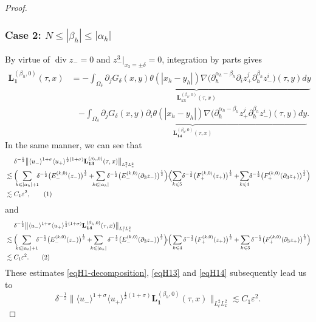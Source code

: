 \documentclass[10pt,reqno]{amsart}
\numberwithin{equation}{section}
\begin{document}
\begin{proof}
	\subsubsection*{\bf Case 2: $N\leqslant|\beta_h|\leqslant |\alpha_h|$}
	By virtue of $\operatorname{div}z_-=0$ and $ z^3_{-}|_{x_3=\pm\delta}=0$,  integration by parts gives
	\begin{align*}
		\mathbf{L}_{\mathbf{1}}^{(\beta_h,0)}(\tau,x)
		&=
		\underbrace{-\int_{\Omega_\delta}\partial_j G_\delta(x,y)\theta(|x_h-y_h|)\nabla\big(\partial_{h}^{\alpha_h-\beta_h}\partial_iz_+^j\partial_{h}^{\beta_h}z_-^i\big)(\tau,y)dy}_{\displaystyle \mathbf{L}_{\mathbf{13}}^{(\beta_h,0)}(\tau,x)}\\
		&\ \ \ \ \underbrace{-\int_{\Omega_\delta}\partial_j G_\delta(x,y)\partial_i\theta(|x_h-y_h|)\nabla\big(\partial_{h}^{\alpha_h-\beta_h}z_+^j\partial_{h}^{\beta_h}z_-^i\big)(\tau,y)dy}_{\displaystyle \mathbf{L}_{\mathbf{14}}^{(\beta_h,0)}(\tau,x)}.
	\end{align*}
	In the same manner, we can see that 
	\begin{align*}
		&\ \ \ \ \delta^{-\frac{1}{2}}\big\|\langle u_-\rangle^{1+\sigma}\langle u_+\rangle^{\frac{1}{2}(1+\sigma)}\mathbf{L}_{\mathbf{13}}^{(\beta_h,0)}(\tau,x)\big\|_{L^2_tL^2_x}\\
		&\lesssim \Big(\!\!\!\sum_{k\leqslant |\alpha_h|+1}\!\!\!\delta^{-\frac{1}{2}}\big(E_-^{(k,0)}(z_-)\big)^{\frac{1}{2}}+\!\!\!\sum_{k\leqslant |\alpha_h|}\!\!\!\delta^{-\frac{1}{2}}\big(E_-^{(k,0)}(\partial_3z_-)\big)^{\frac{1}{2}}\Big)\!\!
		\cdot\!\!\Big(\!\sum_{k\leqslant 5}\!\delta^{-\frac{1}{2}}\big(F_+^{(k,0)}(z_+)\big)^{\frac{1}{2}}+\!\sum_{k\leqslant 4}\!\delta^{-\frac{1}{2}}\big(F_+^{(k,0)}(\partial_3z_+)\big)^{\frac{1}{2}}\Big)\\
		&\lesssim C_1\varepsilon^2,\stepcounter{equation}\tag{\theequation}\label{eqH13}
	\end{align*}
	and
	\begin{align*}
		&\ \ \ \ 	\delta^{-\frac{1}{2}}\big\|\langle u_-\rangle^{1+\sigma}\langle u_+\rangle^{\frac{1}{2}(1+\sigma)}\mathbf{L}_{\mathbf{14}}^{(\beta_h,0)}(\tau,x)\big\|_{L^2_tL^2_x}\\
		&\lesssim \Big(\!\!\!\sum_{k\leqslant |\alpha_h|+1}\!\!\!\delta^{-\frac{1}{2}}\big(E_-^{(k,0)}(z_-)\big)^{\frac{1}{2}}+\!\!\!\sum_{k\leqslant |\alpha_h|}\delta^{-\frac{1}{2}}\big(E_-^{(k,0)}(\partial_3z_-)\big)^{\frac{1}{2}}\Big)\!\!\cdot\!\!\Big(\sum_{k\leqslant 4}\delta^{-\frac{1}{2}}\big(F_+^{(k,0)}(z_+)\big)^{\frac{1}{2}}+\sum_{k\leqslant 3}\delta^{-\frac{1}{2}}\big(F_+^{(k,0)}(\partial_3z_+)\big)^{\frac{1}{2}}\Big)\\
		&\lesssim C_1\varepsilon^2.\stepcounter{equation}\tag{\theequation}\label{eqH14}
	\end{align*}
	These estimates \eqref{eqH1-decomposition}, \eqref{eqH13} and \eqref{eqH14}  
	subsequently lead us to 
	\begin{equation}\label{eqH1case2estimate}
		\delta^{-\frac{1}{2}}\big\|\langle u_-\rangle^{1+\sigma}\langle u_+\rangle^{\frac{1}{2}(1+\sigma)}	\mathbf{L}_{\mathbf{1}}^{(\beta_h,0)}(\tau,x)\big\|_{L^2_tL^2_x}\lesssim C_1\varepsilon^2.
	\end{equation}
	

\end{proof}
\end{document}
